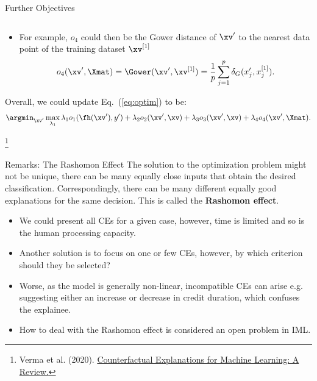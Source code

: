 \documentclass[11pt,compress,t,notes=noshow, xcolor=table]{beamer}
\begin{document}
\begin{vbframe}{Further Objectives}
\begin{columns}
\begin{column}{0.4\textwidth}
		\vspace{0.3cm}
	\end{column}
	\end{columns}
	\begin{itemize}
		\item For example, $o_4$ could then be the Gower distance of $\xv'$ to the nearest data point of the training dataset $\xv^{[1]}$
	$$o_4(\xv', \Xmat) = \Gower(\xv', \xv^{[1]}) = \frac{1}{p} \sum_{j = 1}^{p}  \delta_G(x_j', x^{[1]}_j).$$
		\end{itemize}
	
	Overall, we could update Eq.~(\ref{eq:optim}) to be: 
	\begin{equation}
		\argmin_{\xv'} \max_{\lambda_1} \lambda_1 o_1(\fh(\xv'), y') + \lambda_2 o_2(\xv', \xv) + \lambda_3 o_3(\xv', \xv) + \lambda_4 o_4(\xv', \Xmat).
	\end{equation}


\footnote[frame]{Verma et al. (2020). \href{https://arxiv.org/pdf/2010.10596.pdf}{Counterfactual Explanations for Machine Learning: A Review.}}

\end{vbframe}

\begin{vbframe}{Remarks: The Rashomon Effect}
The solution to the optimization problem might not be unique, there can be many equally close inputs that obtain the desired classification. Correspondingly, there can be many different equally good explanations for the same decision. This is called the \textbf{Rashomon effect}.
	\begin{itemize}
		\item We could present all CEs for a given case, however, time is limited and so is the human processing capacity.
		\item Another solution is to focus on one or few CEs, however, by which criterion should they be selected?
		\item Worse, as the model is generally non-linear, incompatible CEs can arise e.g. suggesting either an increase or decrease in credit duration, which confuses the explainee.
		\item How to deal with the Rashomon effect is considered an open problem in IML.
	\end{itemize}
\end{vbframe}
\end{document}
